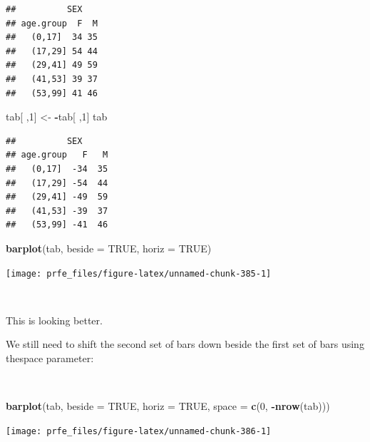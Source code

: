 \documentclass[12pt,a4paper]{book}
\newenvironment{Shaded}{\begin{snugshade}}{\end{snugshade}}
\newcommand{\DataTypeTok}[1]{\textcolor[rgb]{0.13,0.29,0.53}{#1}}
\newcommand{\DecValTok}[1]{\textcolor[rgb]{0.00,0.00,0.81}{#1}}
\newcommand{\KeywordTok}[1]{\textcolor[rgb]{0.13,0.29,0.53}{\textbf{#1}}}
\newcommand{\NormalTok}[1]{#1}
\newcommand{\OperatorTok}[1]{\textcolor[rgb]{0.81,0.36,0.00}{\textbf{#1}}}
\newcommand{\OtherTok}[1]{\textcolor[rgb]{0.56,0.35,0.01}{#1}}
\newcommand{\StringTok}[1]{\textcolor[rgb]{0.31,0.60,0.02}{#1}}
\theoremstyle{definition}
\theoremstyle{definition}
\theoremstyle{definition}
\theoremstyle{remark}
\begin{document}
\begin{verbatim}
##          SEX
## age.group  F  M
##   (0,17]  34 35
##   (17,29] 54 44
##   (29,41] 49 59
##   (41,53] 39 37
##   (53,99] 41 46
\end{verbatim}

\begin{Shaded}
\begin{Highlighting}[]
\NormalTok{tab[ ,}\DecValTok{1}\NormalTok{] <-}\StringTok{ }\OperatorTok{-}\NormalTok{tab[ ,}\DecValTok{1}\NormalTok{]}
\NormalTok{tab}
\end{Highlighting}
\end{Shaded}

\begin{verbatim}
##          SEX
## age.group   F   M
##   (0,17]  -34  35
##   (17,29] -54  44
##   (29,41] -49  59
##   (41,53] -39  37
##   (53,99] -41  46
\end{verbatim}

\begin{Shaded}
\begin{Highlighting}[]
\KeywordTok{barplot}\NormalTok{(tab, }\DataTypeTok{beside =} \OtherTok{TRUE}\NormalTok{, }\DataTypeTok{horiz =} \OtherTok{TRUE}\NormalTok{)}
\end{Highlighting}
\end{Shaded}

\begin{center}\texttt{[image: prfe\_files/figure-latex/unnamed-chunk-385-1]} \end{center}

~

This is looking better.

We still need to shift the second set of bars down beside the first set
of bars using thespace parameter:

~

\begin{Shaded}
\begin{Highlighting}[]
\KeywordTok{barplot}\NormalTok{(tab, }\DataTypeTok{beside =} \OtherTok{TRUE}\NormalTok{, }\DataTypeTok{horiz =} \OtherTok{TRUE}\NormalTok{, }\DataTypeTok{space =} \KeywordTok{c}\NormalTok{(}\DecValTok{0}\NormalTok{, }\OperatorTok{-}\KeywordTok{nrow}\NormalTok{(tab)))}
\end{Highlighting}
\end{Shaded}

\begin{center}\texttt{[image: prfe\_files/figure-latex/unnamed-chunk-386-1]} \end{center}
\end{document}
